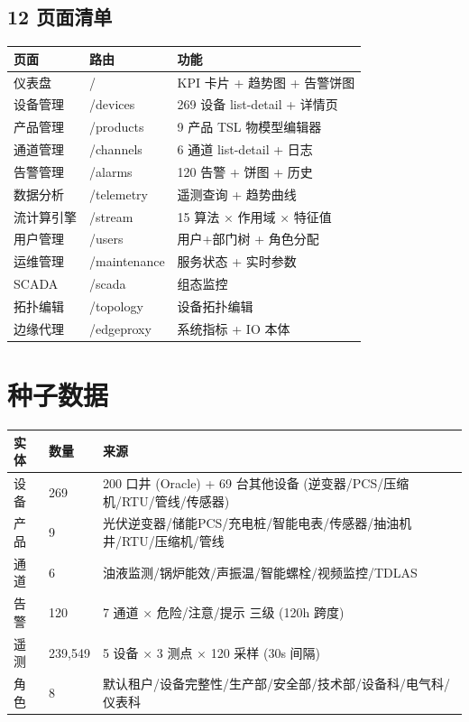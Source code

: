 \documentclass[12pt,a4paper]{ctexart}
\begin{document}
\subsection{12 页面清单}

\begin{table}[H]\centering
\begin{tabular}{p{2.5cm}p{3cm}p{7cm}}
\toprule
\textbf{页面} & \textbf{路由} & \textbf{功能} \\
\midrule
仪表盘 & / & KPI 卡片 + 趋势图 + 告警饼图 \\
设备管理 & /devices & 269 设备 list-detail + 详情页 \\
产品管理 & /products & 9 产品 TSL 物模型编辑器 \\
通道管理 & /channels & 6 通道 list-detail + 日志 \\
告警管理 & /alarms & 120 告警 + 饼图 + 历史 \\
数据分析 & /telemetry & 遥测查询 + 趋势曲线 \\
流计算引擎 & /stream & 15 算法 × 作用域 × 特征值 \\
用户管理 & /users & 用户+部门树 + 角色分配 \\
运维管理 & /maintenance & 服务状态 + 实时参数 \\
SCADA & /scada & 组态监控 \\
拓扑编辑 & /topology & 设备拓扑编辑 \\
边缘代理 & /edgeproxy & 系统指标 + IO 本体 \\
\bottomrule
\end{tabular}
\end{table}

\section{种子数据}

\begin{longtable}{p{3.5cm}p{2.5cm}p{7cm}}
\toprule
\textbf{实体} & \textbf{数量} & \textbf{来源} \\
\midrule
设备 & 269 & 200 口井 (Oracle) + 69 台其他设备 (逆变器/PCS/压缩机/RTU/管线/传感器) \\
产品 & 9 & 光伏逆变器/储能PCS/充电桩/智能电表/传感器/抽油机井/RTU/压缩机/管线 \\
通道 & 6 & 油液监测/锅炉能效/声振温/智能螺栓/视频监控/TDLAS \\
告警 & 120 & 7 通道 × 危险/注意/提示 三级 (120h 跨度) \\
遥测 & 239,549 & 5 设备 × 3 测点 × 120 采样 (30s 间隔) \\
角色 & 8 & 默认租户/设备完整性/生产部/安全部/技术部/设备科/电气科/仪表科 \\
\bottomrule
\end{longtable}
\end{document}
